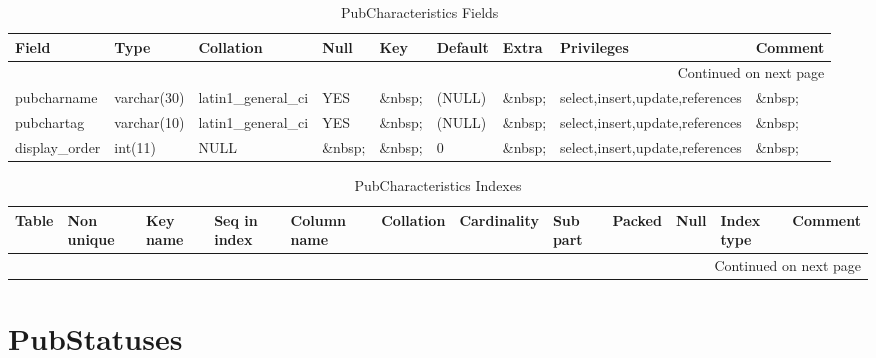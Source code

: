 \documentclass[tablesignature,landscape]{scrartcl}
\begin{document}
\begin{longtable}{|l|l|l|l|l|l|l|l|l|}
\caption{PubCharacteristics Fields} \label{tbl:pubcharacteristicsfields}\\
\hline
 Field             &  Type         &  Collation                &  Null     &  Key      &  Default  &  Extra              &  Privileges                       &  Comment \\
\hline
\endhead
\hline\multicolumn{9}{r}{Continued on next page}\
\endfoot
\endlastfoot
\hline
 pubcharid         &  int(11)      &  NULL                     &  \&nbsp;  &  PRI      &  (NULL)   &  auto\_{}increment  &  select,insert,update,references  &  \&nbsp;  \\
 pubcharname       &  varchar(30)  &  latin1\_{}general\_{}ci  &  YES      &  \&nbsp;  &  (NULL)   &  \&nbsp;            &  select,insert,update,references  &  \&nbsp;  \\
 pubchartag        &  varchar(10)  &  latin1\_{}general\_{}ci  &  YES      &  \&nbsp;  &  (NULL)   &  \&nbsp;            &  select,insert,update,references  &  \&nbsp;  \\
 display\_{}order  &  int(11)      &  NULL                     &  \&nbsp;  &  \&nbsp;  &  0        &  \&nbsp;            &  select,insert,update,references  &  \&nbsp;  \\
\hline
\end{longtable}


\begin{longtable}{|l|l|l|l|l|l|l|l|l|l|l|l|}
\caption{PubCharacteristics Indexes} \label{tbl:pubcharacteristicsindexes}\\
\hline
 Table               &  Non unique  &  Key name  &  Seq in index  &  Column name  &  Collation  &  Cardinality  &  Sub part  &  Packed  &  Null     &  Index type  &  Comment \\
\hline
\endhead
\hline\multicolumn{12}{r}{Continued on next page}\
\endfoot
\endlastfoot
\hline
 PubCharacteristics  &           0  &  PRIMARY   &             1  &  pubcharid    &  A          &            4  &  (NULL)    &  (NULL)  &  \&nbsp;  &  BTREE       &  \&nbsp;  \\
\hline
\end{longtable}
\section{PubStatuses}
\label{sec-18}
\end{document}
